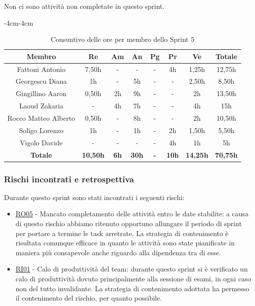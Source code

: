 \documentclass[a4paper,12pt]{article}
\begin{document}
Non ci sono attività non completate in questo sprint.

\begin{table}[H]
    \begin{adjustwidth}{-4cm}{-4cm}
    \centering
    \begin{tabular}{|c|c|c|c|c|c|c|c|}
        \hline
        \textbf{Membro} & \textbf{Re} & \textbf{Am}  & \textbf{An} & \textbf{Pg} & \textbf{Pr} & \textbf{Ve} & \textbf{Totale} \\
        \hline
        Fattoni Antonio & 7,50h & - & - & - & 4h & 1,25h & 12,75h \\
        \hline
        Georgescu Diana & 1h & - & 5h & - & - & 2,50h & 8,50h \\
        \hline
        Gingillino Aaron & 0,50h & 2h & 9h & - & - & 2h & 13,50h \\
        \hline
        Laoud Zakaria & - & 4h & 7h & - & - & 4h & 15h \\
        \hline
        Rocco Matteo Alberto & 0,50h & - & 8h & - & - & 2h & 10,50h \\
        \hline
        Soligo Lorenzo & 1h & - & 1h & - & 2h & 1,50h & 5,50h \\
        \hline
        Vigolo Davide & - & - & - & - & 4h & 1h & 5h \\
        \hline
        \textbf{Totale} & \textbf{10,50h} & \textbf{6h} & \textbf{30h} & \textbf{-} & \textbf{10h} & \textbf{14,25h} & \textbf{70,75h} \\
        \hline
    \end{tabular}
    \caption{Consuntivo delle ore per membro dello Sprint 5}
    \end{adjustwidth}
\end{table}

\subsubsection{Rischi incontrati e retrospettiva}
Durante questo sprint sono stati incontrati i seguenti rischi:
\begin{itemize}
    \item \hyperref[RO05]{RO05} - Mancato completamento delle attività entro le date stabilite: a causa di questo rischio abbiamo ritenuto opportuno allungare il periodo di sprint per portare a termine le task arretrate. La strategia di contenimento è risultata comunque efficace in quanto le attività sono state pianificate in maniera più consapevole anche riguardo alla dipendenza tra di esse.
    \item \hyperref[RI01]{RI01} - Calo di produttività del team: durante questo sprint si è verificato un calo di produttività dovuto principalmente alla sessione di esami, in ogni caso non del tutto invalidante. La strategia di contenimento adottata ha permesso il contenimento del rischio, per quanto possibile.
\end{itemize}
\end{document}
